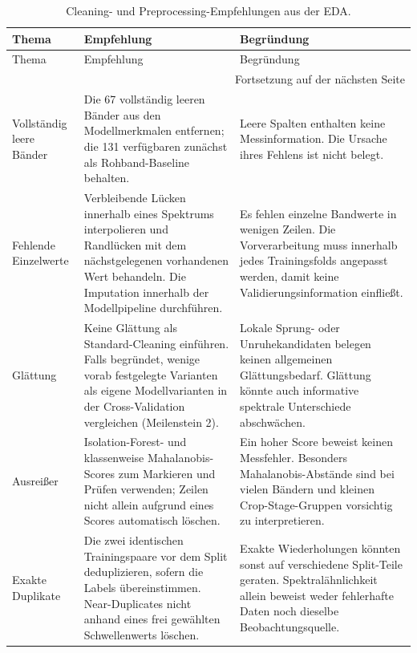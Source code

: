 \documentclass[11pt,a4paper]{article}
\begin{document}
\begingroup
\small
\setlength{\tabcolsep}{3pt}
\renewcommand{\arraystretch}{1.15}
\begin{longtable}{p{2.4cm}p{6.0cm}p{6.9cm}}
\caption{Cleaning- und Preprocessing-Empfehlungen aus der EDA.}\label{tab:cleaning-entscheidungen}\\
\toprule
Thema & Empfehlung & Begründung \\
\midrule
\endfirsthead
\toprule
Thema & Empfehlung & Begründung \\
\midrule
\endhead
\midrule
\multicolumn{3}{r}{Fortsetzung auf der nächsten Seite}\\
\endfoot
\bottomrule
\endlastfoot

Vollständig leere Bänder & Die 67 vollständig leeren Bänder aus den Modellmerkmalen entfernen; die 131 verfügbaren zunächst als Rohband-Baseline behalten. & Leere Spalten enthalten keine Messinformation. Die Ursache ihres Fehlens ist nicht belegt.  \\

Fehlende Einzelwerte & Verbleibende Lücken innerhalb eines Spektrums interpolieren und Randlücken mit dem nächstgelegenen vorhandenen Wert behandeln. Die Imputation innerhalb der Modellpipeline durchführen. & Es fehlen einzelne Bandwerte in wenigen Zeilen. Die Vorverarbeitung muss innerhalb jedes Trainingsfolds angepasst werden, damit keine Validierungsinformation einfließt. \\

Glättung & Keine Glättung als Standard-Cleaning einführen. Falls begründet, wenige vorab festgelegte Varianten als eigene Modellvarianten in der Cross-Validation vergleichen (Meilenstein 2). & Lokale Sprung- oder Unruhekandidaten belegen keinen allgemeinen Glättungsbedarf. Glättung könnte auch informative spektrale Unterschiede abschwächen. \\

Ausreißer & Isolation-Forest- und klassenweise Mahalanobis-Scores zum Markieren und Prüfen verwenden; Zeilen nicht allein aufgrund eines Scores automatisch löschen. & Ein hoher Score beweist keinen Messfehler. Besonders Mahalanobis-Abstände sind bei vielen Bändern und kleinen Crop-Stage-Gruppen vorsichtig zu interpretieren. \\

Exakte Duplikate & Die zwei identischen Trainingspaare vor dem Split deduplizieren, sofern die Labels übereinstimmen. Near-Duplicates nicht anhand eines frei gewählten Schwellenwerts löschen. & Exakte Wiederholungen könnten sonst auf verschiedene Split-Teile geraten. Spektralähnlichkeit allein beweist weder fehlerhafte Daten noch dieselbe Beobachtungsquelle. \\


\end{longtable}
\end{document}
